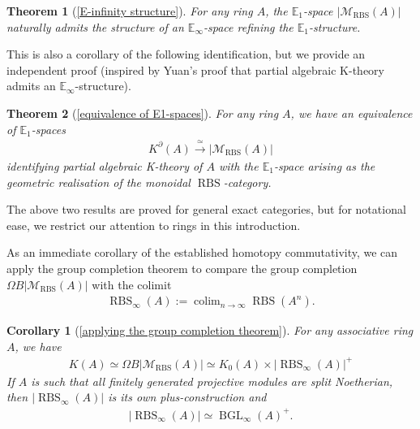 \documentclass[12pt, reqno]{amsart}
\theoremstyle{plain}
\newtheorem*{theorem*}{Theorem}
\newtheorem*{corollary*}{Corollary}
\theoremstyle{definition}
\begin{document}
\begin{theorem*}[\ref{E-infinity structure}]
For any ring $A$, the $\mathbb{E}_1$-space $|\mathscr{M}_{\operatorname{RBS}}(A)|$ naturally admits the structure of an $\mathbb{E}_\infty$-space refining the $\mathbb{E}_1$-structure.
\end{theorem*}

This is also a corollary of the following identification, but we provide an independent proof (inspired by Yuan's proof that partial algebraic K-theory admits an $\mathbb{E}_\infty$-structure).

\begin{theorem*}[\ref{equivalence of E1-spaces}]
For any ring $A$, we have an equivalence of $\mathbb{E}_1$-spaces
\begin{align*}
K^\partial(A) \xrightarrow{\ \simeq\ } |\mathscr{M}_{\operatorname{RBS}}(A)|
\end{align*}
identifying partial algebraic K-theory of $A$ with the $\mathbb{E}_1$-space arising as the geometric realisation of the monoidal $\operatorname{RBS}$-category.
\end{theorem*}

The above two results are proved for general exact categories, but for notational ease, we restrict our attention to rings in this introduction.

As an immediate corollary of the established homotopy commutativity, we can apply the group completion theorem to compare the group completion $\Omega B|\mathscr{M}_{\operatorname{RBS}}(A)|$ with the colimit
\begin{align*}
\operatorname{RBS}_\infty(A):=\displaystyle\mathop{\operatorname{colim}}_{n\rightarrow \infty}\operatorname{RBS}(A^n).
\end{align*}

\begin{corollary*}[\ref{applying the group completion theorem}]
For any associative ring $A$, we have
\begin{align*}
K(A)\simeq \Omega B|\mathscr{M}_{\operatorname{RBS}}(A)|\simeq K_0(A)\times |\operatorname{RBS}_\infty(A)|^+
\end{align*}
If $A$ is such that all finitely generated projective modules are split Noetherian, then $|\operatorname{RBS}_\infty(A)|$ is its own plus-construction and
\begin{align*}
|\operatorname{RBS}_\infty(A)|\simeq \operatorname{BGL}_\infty(A)^+.
\end{align*}
\end{corollary*}
\end{document}
